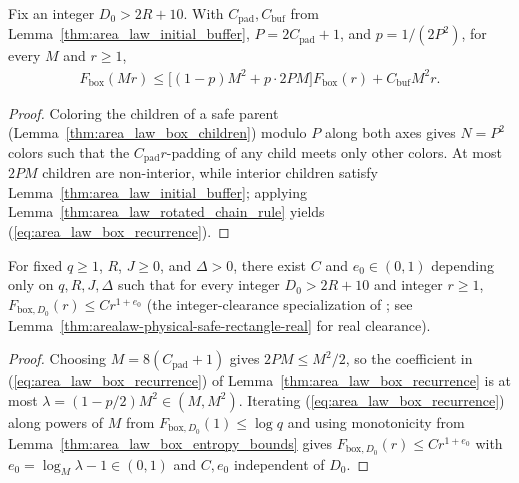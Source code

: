 \begin{lemma}
    \label{thm:area_law_box_recurrence}
    \leanok
    Fix an integer $D_0>2R+10$. With $C_{\mathrm{pad}},C_{\mathrm{buf}}$ from
    Lemma~\ref{thm:area_law_initial_buffer}, $P=2C_{\mathrm{pad}}+1$, and
    $p=1/(2P^2)$, for every $M$ and $r\ge1$,
    \begin{align}
        F_{\mathrm{box}}(Mr)\le\bigl[(1-p)M^2+p\cdot2PM\bigr]F_{\mathrm{box}}(r)
        +C_{\mathrm{buf}}M^2r.
        \label{eq:area_law_box_recurrence}
    \end{align}
\end{lemma}
\begin{proof}\leanok
    Coloring the children of a safe parent (Lemma~\ref{thm:area_law_box_children})
    modulo $P$ along both axes gives $N=P^2$ colors such that the
    $C_{\mathrm{pad}}r$-padding of any child meets only other colors. At most
    $2PM$ children are non-interior, while interior children satisfy
    Lemma~\ref{thm:area_law_initial_buffer}; applying
    Lemma~\ref{thm:area_law_rotated_chain_rule} yields
    (\ref{eq:area_law_box_recurrence}).
\end{proof}

\begin{theorem}
    \label{thm:area_law_initial_box}
    \leanok
    For fixed $q\ge1$, $R$, $J\ge0$, and $\Delta>0$, there exist $C$ and
    $e_0\in(0,1)$ depending only on $q,R,J,\Delta$ such that for every integer
    $D_0>2R+10$ and integer $r\ge1$, $F_{\mathrm{box},D_0}(r)\le Cr^{1+e_0}$
    (the integer-clearance specialization of
    \cite[Proposition~3.3]{OpenAI2026AreaLaw}; see
    Lemma~\ref{thm:arealaw-physical-safe-rectangle-real} for real clearance).
\end{theorem}
\begin{proof}\leanok
    Choosing $M=8(C_{\mathrm{pad}}+1)$ gives $2PM\le M^2/2$, so the coefficient
    in (\ref{eq:area_law_box_recurrence}) of
    Lemma~\ref{thm:area_law_box_recurrence} is at most
    $\lambda=(1-p/2)M^2\in(M,M^2)$. Iterating (\ref{eq:area_law_box_recurrence})
    along powers of $M$ from $F_{\mathrm{box},D_0}(1)\le\log q$ and using
    monotonicity from Lemma~\ref{thm:area_law_box_entropy_bounds} gives
    $F_{\mathrm{box},D_0}(r)\le Cr^{1+e_0}$ with $e_0=\log_M\lambda-1\in(0,1)$
    and $C,e_0$ independent of $D_0$.
\end{proof}

